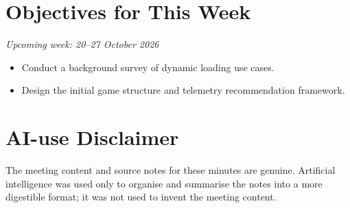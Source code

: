 \documentclass[12pt,a4paper]{article}
\begin{document}
\section{Objectives for This Week}

\noindent\textit{Upcoming week: 20--27 October 2026}
\begin{itemize}[leftmargin=*]
    \item Conduct a background survey of dynamic loading use cases.
    \item Design the initial game structure and telemetry recommendation framework.
\end{itemize}

\section*{\small AI-use Disclaimer}
\small The meeting content and source notes for these minutes are genuine. Artificial intelligence was used only to organise and summarise the notes into a more digestible format; it was not used to invent the meeting content.
\end{document}
